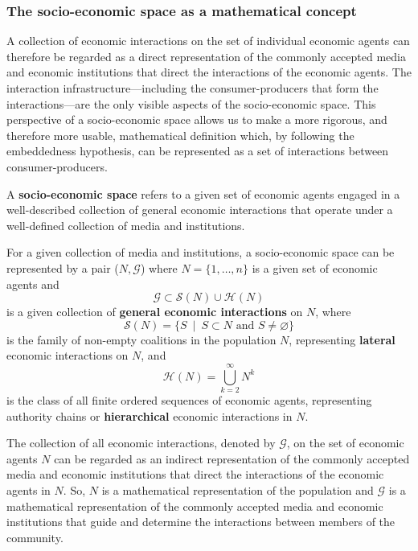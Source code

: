 \subsubsection{The socio-economic space as a mathematical concept}

A collection of economic interactions on the set of individual economic agents can therefore be regarded as a direct representation of the commonly accepted media and economic institutions that direct the interactions of the economic agents. The interaction infrastructure---including the consumer-producers that form the interactions---are the only visible aspects of the socio-economic space. This perspective of a socio-economic space allows us to make a more rigorous, and therefore more usable, mathematical definition which, by following the embeddedness hypothesis, can be represented as a set of interactions between consumer-producers.
\begin{definition} \label{def:socioeconomicspace}
A \textbf{socio-economic space} refers to a given set of economic agents engaged in a well-described collection of general economic interactions that operate under a well-defined collection of media and institutions. 

For a given collection of media and institutions, a socio-economic space can be represented by a pair ($N, \mathcal{G}$) where $N = \{ 1, \ldots, n \}$ is a given set of economic agents and
\begin{equation}
\mathcal{G} \subset \mathcal{S}(N) \cup \mathcal{H}(N)
\end{equation}
is a given collection of \textbf{general economic interactions} on $N$, where
\begin{equation}
\mathcal{S}(N) = \{ S ~ \mid ~ S \subset N \mbox{ and } S \neq \varnothing \}
\end{equation}
is the family of non-empty coalitions in the population $N$, representing \textbf{lateral} economic interactions on $N$, and
\begin{equation}
\mathcal{H}(N) = \bigcup_{k = 2}^{\infty} N^{k}
\end{equation}
is the class of all finite ordered sequences of economic agents, representing authority chains or \textbf{hierarchical} economic interactions in $N$.
\end{definition}
The collection of all economic interactions, denoted by $\mathcal{G}$, on the set of economic agents $N$ can be regarded as an indirect representation of the commonly accepted media and economic institutions that direct the interactions of the economic agents in $N$. So, $N$ is a mathematical representation of the population and $\mathcal{G}$ is a mathematical representation of the commonly accepted media and economic institutions that guide and determine the interactions between members of the community.

